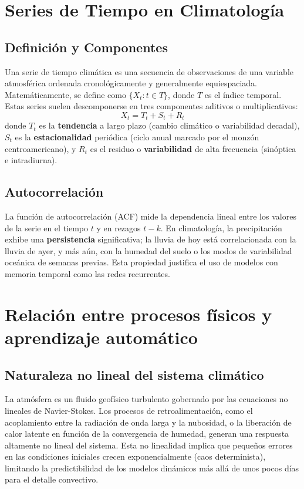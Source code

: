 \section{Series de Tiempo en Climatología}

\subsection{Definición y Componentes}
Una serie de tiempo climática es una secuencia de observaciones de una variable atmosférica ordenada cronológicamente y generalmente equiespaciada. Matemáticamente, se define como \(\{X_t : t \in T\}\), donde \(T\) es el índice temporal. Estas series suelen descomponerse en tres componentes aditivos o multiplicativos:
\begin{equation}
    X_t = T_t + S_t + R_t
\end{equation}
donde \(T_t\) es la \textbf{tendencia} a largo plazo (cambio climático o variabilidad decadal), \(S_t\) es la \textbf{estacionalidad} periódica (ciclo anual marcado por el monzón centroamericano), y \(R_t\) es el residuo o \textbf{variabilidad} de alta frecuencia (sinóptica e intradiurna).

\subsection{Autocorrelación}
La función de autocorrelación (ACF) mide la dependencia lineal entre los valores de la serie en el tiempo \(t\) y en rezagos \(t-k\). En climatología, la precipitación exhibe una \textbf{persistencia} significativa; la lluvia de hoy está correlacionada con la lluvia de ayer, y más aún, con la humedad del suelo o los modos de variabilidad oceánica de semanas previas. Esta propiedad justifica el uso de modelos con memoria temporal como las redes recurrentes.

\section{Relación entre procesos físicos y aprendizaje automático}

\subsection{Naturaleza no lineal del sistema climático}
La atmósfera es un fluido geofísico turbulento gobernado por las ecuaciones no lineales de Navier-Stokes. Los procesos de retroalimentación, como el acoplamiento entre la radiación de onda larga y la nubosidad, o la liberación de calor latente en función de la convergencia de humedad, generan una respuesta altamente no lineal del sistema. Esta no linealidad implica que pequeños errores en las condiciones iniciales crecen exponencialmente (caos determinista), limitando la predictibilidad de los modelos dinámicos más allá de unos pocos días para el detalle convectivo.

